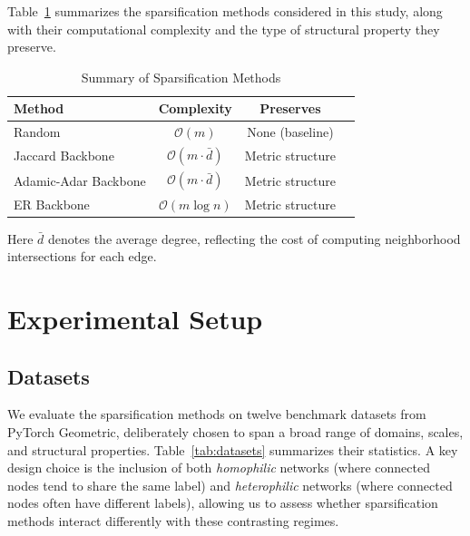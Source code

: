 \documentclass[conference]{IEEEtran}
\begin{document}
Table~\ref{tab:methods_summary} summarizes the sparsification methods considered in this study, along with their computational complexity and the type of structural property they preserve.

\begin{table}[t!]
\caption{Summary of Sparsification Methods}
\begin{center}
\begin{tabular}{lccc}
\toprule
\textbf{Method} & \textbf{Complexity} & \textbf{Preserves} \\
\midrule
Random & $\mathcal{O}(m)$ & None (baseline) \\
Jaccard Backbone & $\mathcal{O}(m \cdot \bar{d})$ & Metric structure \\
Adamic-Adar Backbone & $\mathcal{O}(m \cdot \bar{d})$ & Metric structure \\
ER Backbone & $\mathcal{O}(m \log n)$ & Metric structure \\
\bottomrule
\end{tabular}
\label{tab:methods_summary}
\end{center}
\end{table}

Here $\bar{d}$ denotes the average degree, reflecting the cost of computing neighborhood intersections for each edge.

\section{Experimental Setup}\label{sec:experimental_setup}

\subsection{Datasets}

We evaluate the sparsification methods on twelve benchmark datasets from PyTorch Geometric, deliberately chosen to span a broad range of domains, scales, and structural properties. Table~\ref{tab:datasets} summarizes their statistics. A key design choice is the inclusion of both \emph{homophilic} networks (where connected nodes tend to share the same label) and \emph{heterophilic} networks (where connected nodes often have different labels), allowing us to assess whether sparsification methods interact differently with these contrasting regimes.
\end{document}
